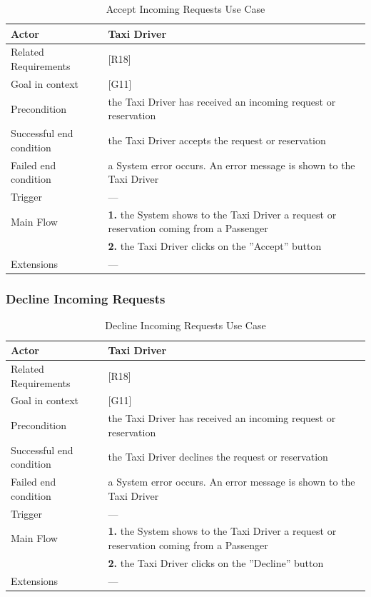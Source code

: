 \begin{table}[htbp]
\begin{center}
\begin{tabular}[t]{p{}p{}}

\hline
Actor & Taxi Driver \\
\hline
Related Requirements & [R18] \\
\hline
Goal in context & [G11] \\
\hline
Precondition & the Taxi Driver has received an incoming request or reservation \\
\hline
Successful end condition & the Taxi Driver accepts the request or reservation \\
\hline
Failed end condition & a System error occurs. An error message is shown to the Taxi Driver  \\
\hline
Trigger & --- \\
\hline
Main Flow & \textbf{1.} the System shows to the Taxi Driver a request or reservation coming from a Passenger \\
& \textbf{2.} the Taxi Driver clicks on the ''Accept'' button \\
\hline
Extensions & --- \\
\hline

\end{tabular}
\end{center}
\caption{Accept Incoming Requests Use Case}
\end{table}
\clearpage

\subsubsection{Decline Incoming Requests}

\begin{table}[htbp]
\begin{center}
\begin{tabular}[t]{p{}p{}}

\hline
Actor & Taxi Driver \\
\hline
Related Requirements & [R18] \\
\hline
Goal in context & [G11] \\
\hline
Precondition & the Taxi Driver has received an incoming request or reservation \\
\hline
Successful end condition & the Taxi Driver declines the request or reservation \\
\hline
Failed end condition & a System error occurs. An error message is shown to the Taxi Driver  \\
\hline
Trigger & --- \\
\hline
Main Flow & \textbf{1.} the System shows to the Taxi Driver a request or reservation coming from a Passenger \\
& \textbf{2.} the Taxi Driver clicks on the ''Decline'' button \\
\hline
Extensions & --- \\
\hline

\end{tabular}
\end{center}
\caption{Decline Incoming Requests Use Case}
\end{table}
\clearpage

